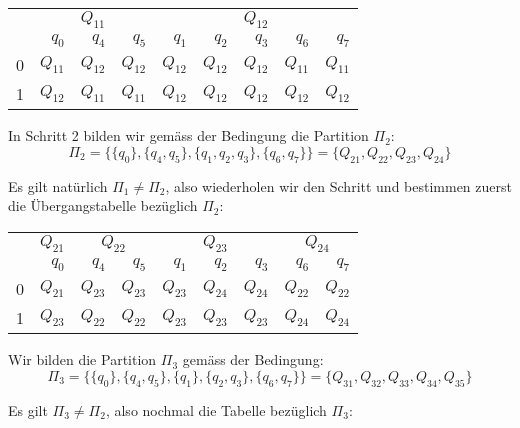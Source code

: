 \documentclass[11pt]{article} %
\theoremstyle{definition}
\begin{document}
\begin{center}
\begin{tabular}{r|rrr|rrrrr}
\toprule
      & \multicolumn{3}{c}{$Q_{11}$} & \multicolumn{5}{c}{$Q_{12}$} \\
      & $q_0$ & $q_4$ & $q_5$ & $q_1$ & $q_2$ & $q_3$ & $q_6$ & $q_7$ \\
\midrule
0     & $Q_{11}$ & $Q_{12}$ & $Q_{12}$ & $Q_{12}$ & $Q_{12}$ & $Q_{12}$ & $Q_{11}$ & $Q_{11}$ \\
1     & $Q_{12}$ & $Q_{11}$ & $Q_{11}$ & $Q_{12}$ & $Q_{12}$ & $Q_{12}$ & $Q_{12}$ & $Q_{12}$ \\
\bottomrule
\end{tabular}%
\end{center}

In Schritt 2 bilden wir gemäss der Bedingung die Partition $\Pi_2$:
\[
\Pi_2 = \{ \{q_0\}, \{q_4, q_5 \}, \{q_1, q_2, q_3 \}, \{q_6, q_7 \}  \} = \{ Q_{21}, Q_{22}, Q_{23}, Q_{24} \}
\]

Es gilt natürlich $\Pi_1 \ne \Pi_2$, also wiederholen wir den Schritt und bestimmen zuerst die Übergangstabelle bezüglich $\Pi_2$:

\begin{center}
\begin{tabular}{r|r|rr|rrr|rr}
\toprule
      & \multicolumn{1}{c}{$Q_{21}$} & \multicolumn{2}{c}{$Q_{22}$} & \multicolumn{3}{c}{$Q_{23}$}& \multicolumn{2}{c}{$Q_{24}$} \\
      & $q_0$ & $q_4$ & $q_5$ & $q_1$ & $q_2$ & $q_3$ & $q_6$ & $q_7$ \\
\midrule
0     & $Q_{21}$ & $Q_{23}$ & $Q_{23}$ & $Q_{23}$ & $Q_{24}$ & $Q_{24}$ & $Q_{22}$ & $Q_{22}$ \\
1     & $Q_{23}$ & $Q_{22}$ & $Q_{22}$ & $Q_{23}$ & $Q_{23}$ & $Q_{23}$ & $Q_{24}$ & $Q_{24}$ \\
\bottomrule
\end{tabular}%
\end{center}

Wir bilden die Partition $\Pi_3$ gemäss der Bedingung:
\[
\Pi_3 = \{\{q_0\}, \{ q_4,q_5\}, \{q_1\}, \{q_2, q_3\}, \{q_6, q_7\}\} = \{ Q_{31}, Q_{32}, Q_{33}, Q_{34}, Q_{35} \}
\]

Es gilt $\Pi_3 \ne \Pi_2$, also nochmal die Tabelle bezüglich $\Pi_3$:
\end{document}
